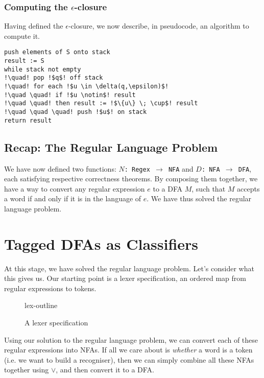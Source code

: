 \subsubsection{Computing the $\epsilon$-closure}
Having defined the $\epsilon$-closure, we now describe, in pseudocode, an algorithm to compute it.

\begin{code}
\begin{lstlisting}[style=pseudocode]
push elements of S onto stack
result := S
while stack not empty
!\quad! pop !$q$! off stack
!\quad! for each !$u \in \delta(q,\epsilon)$!
!\quad \quad! if !$u \notin$! result
!\quad \quad! then result := !$\{u\} \; \cup$! result
!\quad \quad \quad! push !$u$! on stack
return result
\end{lstlisting}
\vspace{2mm}
\end{code}

\subsection{Recap: The Regular Language Problem}
We have now defined two functions: \texttt{$N$: Regex $\rightarrow$ NFA} and \texttt{$D$: NFA $\rightarrow$ DFA}, each satisfying respective correctness theorems. By composing them together, we have a way to convert any regular expression $e$ to a DFA $M$, such that $M$ accepts a word if and only if it is in the language of $e$. We have thus solved the regular language problem.

\section{Tagged DFAs as Classifiers}
At this stage, we have solved the regular language problem. Let's consider what this gives us. Our starting point is a lexer specification, an ordered map from regular expressions to tokens.
\begin{figure}[H]
    \centering
    {lex-outline}
    \caption{A lexer specification}
    \label{fig:lex-outline}
\end{figure}

Using our solution to the regular language problem, we can convert each of these regular expressions into NFAs. If all we care about is \emph{whether} a word is a token (i.e. we want to build a recogniser), then we can simply combine all these NFAs together using $\lor$, and then convert it to a DFA. 

